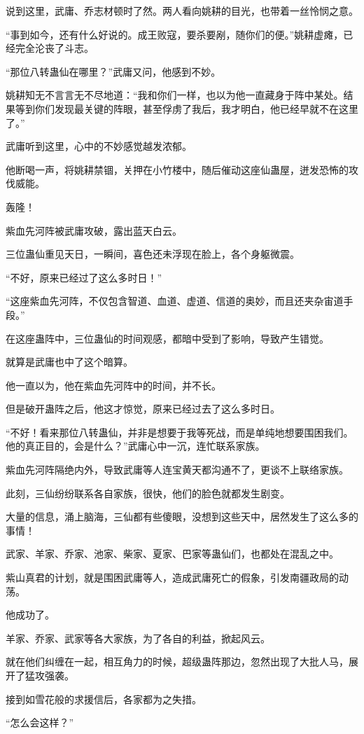 \begin{this_body}
说到这里，武庸、乔志材顿时了然。两人看向姚耕的目光，也带着一丝怜悯之意。

“事到如今，还有什么好说的。成王败寇，要杀要剐，随你们的便。”姚耕虚瘫，已经完全沦丧了斗志。

“那位八转蛊仙在哪里？”武庸又问，他感到不妙。

姚耕知无不言言无不尽地道：“我和你们一样，也以为他一直藏身于阵中某处。结果等到你们发现最关键的阵眼，甚至俘虏了我后，我才明白，他已经早就不在这里了。”

武庸听到这里，心中的不妙感觉越发浓郁。

他断喝一声，将姚耕禁锢，关押在小竹楼中，随后催动这座仙蛊屋，迸发恐怖的攻伐威能。

轰隆！

紫血先河阵被武庸攻破，露出蓝天白云。

三位蛊仙重见天日，一瞬间，喜色还未浮现在脸上，各个身躯微震。

“不好，原来已经过了这么多时日！”

“这座紫血先河阵，不仅包含智道、血道、虚道、信道的奥妙，而且还夹杂宙道手段。”

在这座蛊阵中，三位蛊仙的时间观感，都暗中受到了影响，导致产生错觉。

就算是武庸也中了这个暗算。

他一直以为，他在紫血先河阵中的时间，并不长。

但是破开蛊阵之后，他这才惊觉，原来已经过去了这么多时日。

“不好！看来那位八转蛊仙，并非是想要于我等死战，而是单纯地想要围困我们。他的真正目的，会是什么？”武庸心中一沉，连忙联系家族。

紫血先河阵隔绝内外，导致武庸等人连宝黄天都沟通不了，更谈不上联络家族。

此刻，三仙纷纷联系各自家族，很快，他们的脸色就都发生剧变。

大量的信息，涌上脑海，三仙都有些傻眼，没想到这些天中，居然发生了这么多的事情！

武家、羊家、乔家、池家、柴家、夏家、巴家等蛊仙们，也都处在混乱之中。

紫山真君的计划，就是围困武庸等人，造成武庸死亡的假象，引发南疆政局的动荡。

他成功了。

羊家、乔家、武家等各大家族，为了各自的利益，掀起风云。

就在他们纠缠在一起，相互角力的时候，超级蛊阵那边，忽然出现了大批人马，展开了猛攻强袭。

接到如雪花般的求援信后，各家都为之失措。

“怎么会这样？”


\end{this_body}
